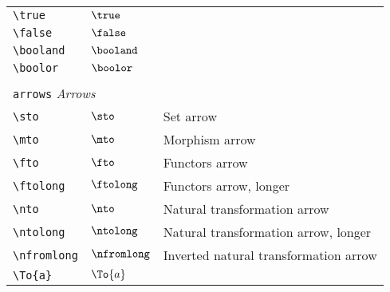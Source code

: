 \begin{longtable}{lll}
  \hline
  {\color[rgb]{0.5,0.5,0.5}\texttt{\textbackslash true}}                                                    & $\true$                    & \\
  {\color[rgb]{0.5,0.5,0.5}\texttt{\textbackslash false}}                                                   & $\false$                   & \\
  {\color[rgb]{0.5,0.5,0.5}\texttt{\textbackslash booland}}                                                 & $\booland$                 & \\
  {\color[rgb]{0.5,0.5,0.5}\texttt{\textbackslash boolor}}                                                  & $\boolor$                  &                                                         \\
  &                            &                                                         \\
  \multicolumn{3}{l}{{\color[rgb]{0.5,0.5,0.5}\texttt{arrows}} \emph{Arrows}} \\
  \hline
  \hline
  {\color[rgb]{0.5,0.5,0.5}\texttt{\textbackslash sto}}                                                     & $\sto$                     & Set arrow\\
  {\color[rgb]{0.5,0.5,0.5}\texttt{\textbackslash mto}}                                                     & $\mto$                     & Morphism arrow\\
  {\color[rgb]{0.5,0.5,0.5}\texttt{\textbackslash fto}}                                                     & $\fto$                     & Functors arrow\\
  {\color[rgb]{0.5,0.5,0.5}\texttt{\textbackslash ftolong}}                                                 & $\ftolong$                 & Functors arrow, longer\\
  {\color[rgb]{0.5,0.5,0.5}\texttt{\textbackslash nto}}                                                     & $\nto$                     & Natural transformation arrow\\
  {\color[rgb]{0.5,0.5,0.5}\texttt{\textbackslash ntolong}}                                                 & $\ntolong$                 & Natural transformation arrow, longer\\
  {\color[rgb]{0.5,0.5,0.5}\texttt{\textbackslash nfromlong}}                                               & $\nfromlong$               & Inverted natural transformation arrow\\
  {\color[rgb]{0.5,0.5,0.5}\texttt{\textbackslash To\{a\}}}                                                 & $\To{a}$                   & \\

\end{longtable}
